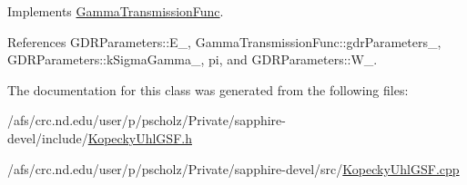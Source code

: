 Implements \hyperlink{classGammaTransmissionFunc_a68156d72ed9620f66f96dc37bbf781aa}{Gamma\-Transmission\-Func}.



References G\-D\-R\-Parameters\-::\-E\-\_\-, Gamma\-Transmission\-Func\-::gdr\-Parameters\-\_\-, G\-D\-R\-Parameters\-::k\-Sigma\-Gamma\-\_\-, pi, and G\-D\-R\-Parameters\-::\-W\-\_\-.



The documentation for this class was generated from the following files\-:\begin{DoxyCompactItemize}
\item 
/afs/crc.\-nd.\-edu/user/p/pscholz/\-Private/sapphire-\/devel/include/\hyperlink{KopeckyUhlGSF_8h}{Kopecky\-Uhl\-G\-S\-F.\-h}\item 
/afs/crc.\-nd.\-edu/user/p/pscholz/\-Private/sapphire-\/devel/src/\hyperlink{KopeckyUhlGSF_8cpp}{Kopecky\-Uhl\-G\-S\-F.\-cpp}\end{DoxyCompactItemize}
